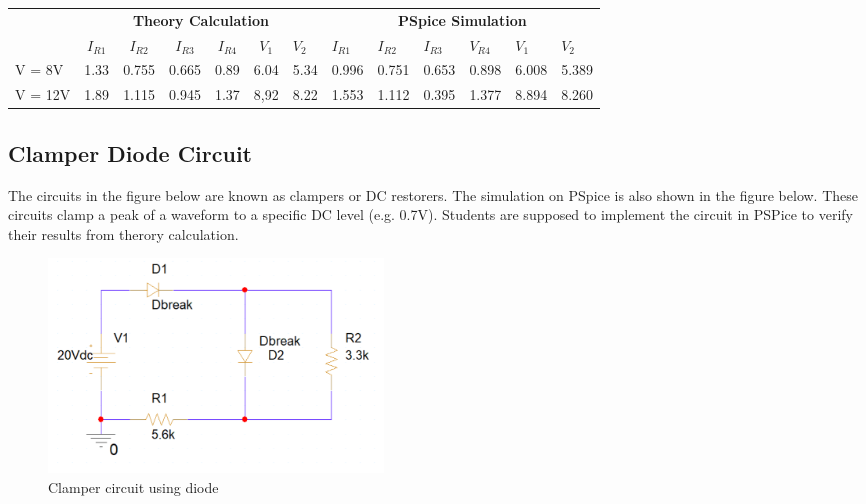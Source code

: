 \begin{center}

    \begin{tabular}{l|l|l|l|l|l|l|l|l|l|l|l|l|}
        \cline{2-13}
                                      & \multicolumn{6}{c|}{\textbf{Theory Calculation}} & \multicolumn{6}{c|}{\textbf{PSpice Simulation}}                                                                                                                                                                    \\ \cline{2-13}
                                      & \multicolumn{1}{c|}{$I_{R1}$}                    & \multicolumn{1}{c|}{$I_{R2}$}                   & \multicolumn{1}{c|}{$I_{R3}$} & \multicolumn{1}{c|}{$I_{R4}$} & \multicolumn{1}{c|}{$V_{1}$} & $V_2$ & $I_{R1}$ & $I_{R2}$ & $I_{R3}$ & $V_{R4}$ & $V_1$ & $V_2$ \\ \hline
        \multicolumn{1}{|l|}{V = 8V}  & 1.33                                             & 0.755                                           & 0.665                         & 0.89                          & 6.04                         & 5.34  & 0.996    & 0.751    & 0.653    & 0.898    & 6.008 & 5.389 \\ \hline
        \multicolumn{1}{|l|}{V = 12V} & 1.89                                             & 1.115                                           & 0.945                         & 1.37                          & 8,92                         & 8.22  & 1.553    & 1.112    & 0.395    & 1.377    & 8.894 & 8.260 \\ \hline
    \end{tabular}

\end{center}

\subsection{Clamper Diode Circuit}
The circuits in the figure below are known as clampers or DC restorers. The simulation on PSpice is also shown in the figure below. These circuits clamp a peak of a waveform to a specific DC level (e.g. 0.7V). Students are supposed to implement the circuit in PSPice to verify their results from therory calculation.
\\
\begin{figure}[!htp]
    \label{pic:halfwave_rectifier1}
    \centering
    \includegraphics[width = 3.5in]{source/picture/bai_2/diode_11.PNG}
    \caption{Clamper circuit using diode}
    \label{lab02_ex031c}
\end{figure}

